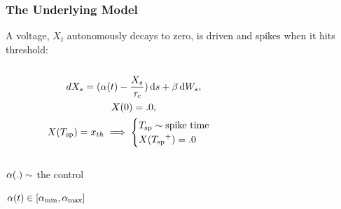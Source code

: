 \documentclass{beamer}
\begin{document}
\begin{frame}
\frametitle{The Underlying Model}
A voltage, $X_t$ autonomously decays to zero, is driven and spikes when it hits
threshold:
\begin{columns}[T]
\begin{column}{5cm}
\begin{equation*}
\begin{gathered}
dX_s = ({\alpha}(t) - \frac{X_s}{{ \tau_{c} }} ) \, \mathrm{d} s + {\beta} \, \mathrm{d} W_s,
\\
X(0) = .0,
\\
X({ T_{\textrm{sp} } }) = { x_{th} } \implies
\begin{cases}
{ T_{\textrm{sp} } } \sim \text{spike time} 
\\
X({ T_{\textrm{sp} } }^+) = .0 &
\end{cases}
\end{gathered}
\end{equation*}
\end{column}
\begin{column}{5cm} 
\end{column}
\end{columns}

\pause
\begin{center}
${\alpha}(.) \sim$ the control

${\alpha}(t)\in [{ {\alpha}_{\textrm{min}} },{ {\alpha}_{\textrm{max}} }]$
\end{center}


\end{frame}
\end{document}

